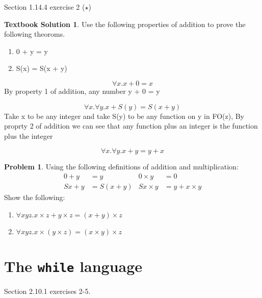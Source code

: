 \documentclass[10pt]{article}
\theoremstyle{definition}
\newtheorem{prob}{Problem}
\newtheorem{ts}{Textbook Solution}
\begin{document}
Section 1.14.4 exercise 2 ($\star$)
\begin{ts}
Use the following properties of addition to prove the following theoroms.
	\begin{enumerate}
	\item 0 + y = y  
	\item S(x)  = S(x + y) 
	\end{enumerate}
	
	\begin{equation}
	\forall x. x + 0 = x
	\end{equation}
	By property 1 of addition, any number y + 0 = y
	
	\begin{equation}
	\forall x. \forall y. x + S(y) = S(x+y)
	\end{equation}
	Take x to be any integer and take S(y) to be any function on y in FO(z), By proprty 2 of addition we can see that any function plus an integer is the function plus the integer
	
	\begin{equation}
	\forall x. \forall y. x + y = y + x
	\end{equation}
\end{ts}



\begin{prob}
  Using the following definitions of addition and multiplication:
  \begin{align*}
    0 + y &= y & 0 \times y &= 0 \\
    Sx + y &= S(x + y) & Sx \times y &= y + x \times y
  \end{align*}
  Show the following:
  \begin{enumerate}[label=(\alph*)]
  \item $\forall x y z. x \times z + y \times z = (x + y) \times z$
  \item $\forall x y z. x \times (y \times z) = (x \times y) \times z$
  \end{enumerate}

\end{prob}

\section*{The \texttt{while} language}

Section 2.10.1 exercises 2-5.
\end{document}
